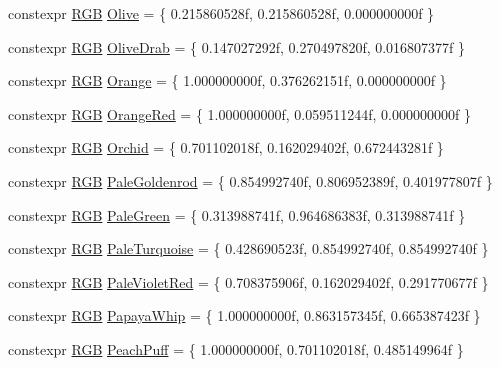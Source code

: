 \begin{DoxyCompactItemize}
\item 
constexpr \mbox{\hyperlink{structmage_1_1_r_g_b}{R\+GB}} \mbox{\hyperlink{namespacemage_1_1color_a7e1414ce4e2b7db430d55135da40fe57}{Olive}} = \{ 0.\+215860528f, 0.\+215860528f, 0.\+000000000f \}
\item 
constexpr \mbox{\hyperlink{structmage_1_1_r_g_b}{R\+GB}} \mbox{\hyperlink{namespacemage_1_1color_af64e33355edbb29b2b6200bc3a4dbe17}{Olive\+Drab}} = \{ 0.\+147027292f, 0.\+270497820f, 0.\+016807377f \}
\item 
constexpr \mbox{\hyperlink{structmage_1_1_r_g_b}{R\+GB}} \mbox{\hyperlink{namespacemage_1_1color_ac29b4832f097eea80e4a07c4b4075ce6}{Orange}} = \{ 1.\+000000000f, 0.\+376262151f, 0.\+000000000f \}
\item 
constexpr \mbox{\hyperlink{structmage_1_1_r_g_b}{R\+GB}} \mbox{\hyperlink{namespacemage_1_1color_a7aa807153f37477c187dac3d059b7f83}{Orange\+Red}} = \{ 1.\+000000000f, 0.\+059511244f, 0.\+000000000f \}
\item 
constexpr \mbox{\hyperlink{structmage_1_1_r_g_b}{R\+GB}} \mbox{\hyperlink{namespacemage_1_1color_a1659e10d131af787628e24db095a5c58}{Orchid}} = \{ 0.\+701102018f, 0.\+162029402f, 0.\+672443281f \}
\item 
constexpr \mbox{\hyperlink{structmage_1_1_r_g_b}{R\+GB}} \mbox{\hyperlink{namespacemage_1_1color_a504a28b76da12e65cc57019bc2481b6f}{Pale\+Goldenrod}} = \{ 0.\+854992740f, 0.\+806952389f, 0.\+401977807f \}
\item 
constexpr \mbox{\hyperlink{structmage_1_1_r_g_b}{R\+GB}} \mbox{\hyperlink{namespacemage_1_1color_a1e055d7a69c5f8f9ffdac938889e306a}{Pale\+Green}} = \{ 0.\+313988741f, 0.\+964686383f, 0.\+313988741f \}
\item 
constexpr \mbox{\hyperlink{structmage_1_1_r_g_b}{R\+GB}} \mbox{\hyperlink{namespacemage_1_1color_ad6ef41327e0e1d862f7b95324e93b4a1}{Pale\+Turquoise}} = \{ 0.\+428690523f, 0.\+854992740f, 0.\+854992740f \}
\item 
constexpr \mbox{\hyperlink{structmage_1_1_r_g_b}{R\+GB}} \mbox{\hyperlink{namespacemage_1_1color_a86d236f89e45680e1678c6d1e9a287bc}{Pale\+Violet\+Red}} = \{ 0.\+708375906f, 0.\+162029402f, 0.\+291770677f \}
\item 
constexpr \mbox{\hyperlink{structmage_1_1_r_g_b}{R\+GB}} \mbox{\hyperlink{namespacemage_1_1color_a209f72744c785cbc48f954bd42b35f79}{Papaya\+Whip}} = \{ 1.\+000000000f, 0.\+863157345f, 0.\+665387423f \}
\item 
constexpr \mbox{\hyperlink{structmage_1_1_r_g_b}{R\+GB}} \mbox{\hyperlink{namespacemage_1_1color_a6ec38a42d469de89ab50cd4db3338754}{Peach\+Puff}} = \{ 1.\+000000000f, 0.\+701102018f, 0.\+485149964f \}

\end{DoxyCompactItemize}
